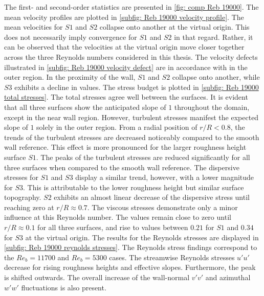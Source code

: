 The first- and second-order statistics are presented in \autoref{fig: comp Reb 19000}.
The mean velocity profiles are plotted in \autoref{subfig: Reb 19000 velocity profile}.
The mean velocities for $S1$ and $S2$ collapse onto another at the virtual origin. 
This does not necessarily imply convergence for $S1$ and $S2$ in that regard.
Rather, it can be observed that the velocities at the virtual origin move closer together across the three Reynolds numbers considered in this thesis.
The velocity defects illustrated in \autoref{subfig: Reb 19000 velocity defect} are in accordance with in the outer region.
In the proximity of the wall, $S1$ and $S2$ collapse onto another, while $S3$ exhibits a decline in values.
The stress budget is plotted in \autoref{subfig: Reb 19000 total stresses}.
The total stresses agree well between the surfaces.
It is evident that all three surfaces show the anticipated slope of $1$ throughout the domain, except in the near wall region.
However, turbulent stresses manifest the expected slope of $1$ solely in the outer region.
From a radial position of $r/R < 0.8$, the trends of the turbulent stresses are decreased noticeably compared to the smooth wall reference.
This effect is more pronounced for the larger roughness height surface $S1$.
The peaks of the turbulent stresses are reduced significantly for all three surfaces when compared to the smooth wall reference.
The dispersive stresses for $S1$ and $S3$ display a similar trend, however, with a lower magnitude for $S3$.
This is attributable to the lower roughness height but similar surface topography.
$S2$ exhibits an almost linear decrease of the dispersive stress until reaching zero at $r/R \approx 0.7$.
The viscous stresses demonstrate only a minor influence at this Reynolds number.
The values remain close to zero until $r/R \approx 0.1$ for all three surfaces, and rise to values between $0.21$ for $S1$ and $0.34$ for $S3$ at the virtual origin.
The results for the Reynolds stresses are displayed in \autoref{subfig: Reb 19000 reynolds stresses}.
The Reynolds stress findings correspond to the $Re_b = 11700$ and $Re_b = 5300$ cases.
The streamwise Reynolds stresses $u'u'$ decrease for rising roughness heights and effective slopes. 
Furthermore, the peak is shifted outwards.
The overall increase of the wall-normal $v'v'$ and azimuthal $w'w'$ fluctuations is also present.


